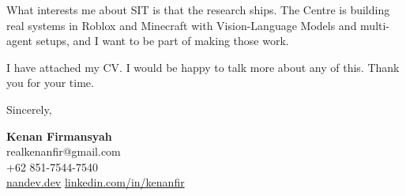 \documentclass[10pt,a4paper]{article}
\begin{document}
\vspace{1em}
\noindent What interests me about SIT is that the research ships. The Centre is building real systems in Roblox and Minecraft with Vision-Language Models and multi-agent setups, and I want to be part of making those work.

\vspace{1em}
\noindent I have attached my CV. I would be happy to talk more about any of this. Thank you for your time.

\vspace{1em}
\noindent Sincerely,

\vspace{1em}
\noindent \textbf{Kenan Firmansyah} \\
\noindent realkenanfir@gmail.com \\
+62 851-7544-7540 \\
\href{https://nandev.dev}{nandev.dev} \quad \textbar \quad \href{https://www.linkedin.com/in/kenanfir/}{linkedin.com/in/kenanfir}
\end{document}

